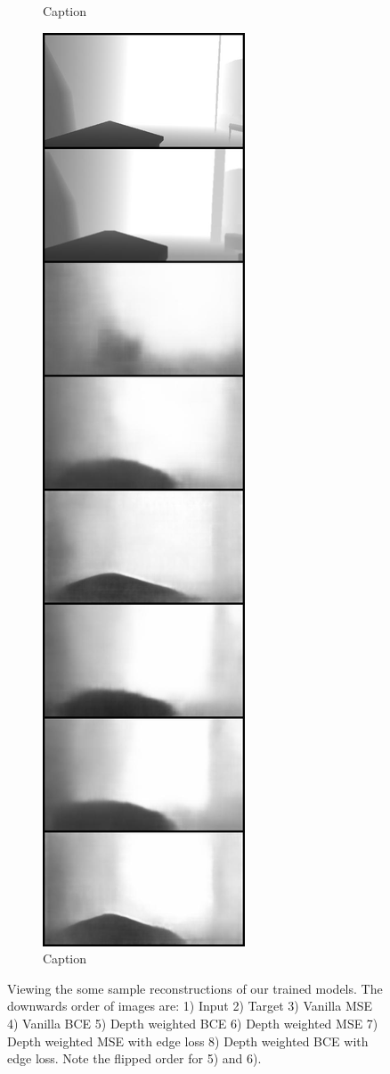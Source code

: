 \begin{figure}[htb]
\begin{subfigure}[b]{0.3\textwidth}
        \caption{Caption}
        \label{fig:the_same_14}
    \end{subfigure} 
    \hfill
    \begin{subfigure}[b]{0.3\textwidth}
        \centering
        \includegraphics[height=\textheight]{figures/8_/the_same_289.jpg}
        \caption{Caption}
        \label{fig:the_same_289}
    \end{subfigure} 
    \caption{Viewing the some sample reconstructions of our trained models. The downwards order of images are: 1) Input 2) Target 3) Vanilla MSE 4) Vanilla BCE 5) Depth weighted BCE 6) Depth weighted MSE 7) Depth weighted MSE with edge loss 8) Depth weighted BCE with edge loss. Note the flipped order for 5) and 6).}
    \label{fig:8_all_vae}
\end{figure}

